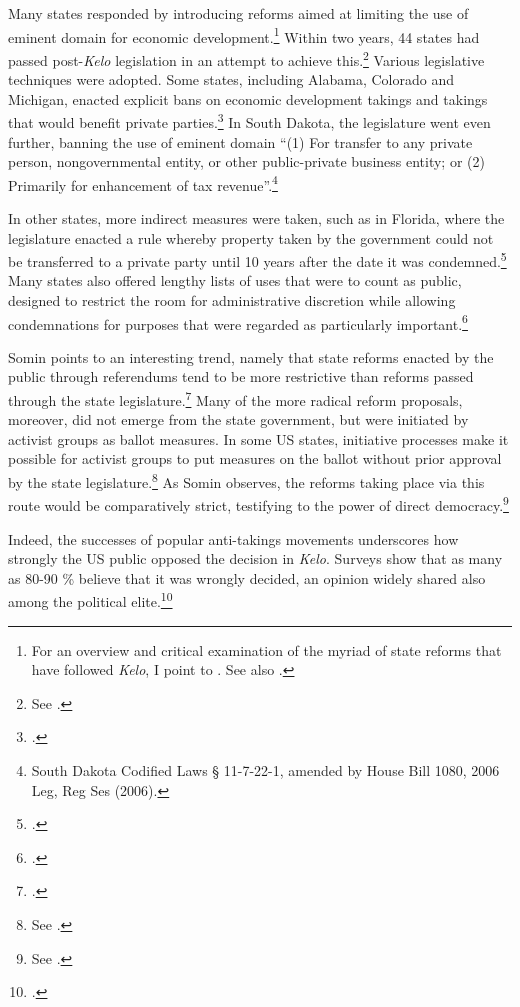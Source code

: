 Many states responded by introducing reforms aimed at limiting the use of eminent domain for economic development.\footnote{For an overview and critical examination of the myriad of state reforms that have followed {\it Kelo}, I point to \cite{eagle08}. See also \cite{somin09}.} Within two years, 44 states had passed post-{\it Kelo} legislation in an attempt to achieve this.\footnote{See \cite{castle}.} Various legislative techniques were adopted. Some states, including Alabama, Colorado and Michigan, enacted explicit bans on economic development takings and takings that would benefit private parties.\footcite[See][107-108]{eagle08} In South Dakota, the legislature went even further, banning the use of eminent domain ``(1) For transfer to any private person, nongovernmental entity, or other public-private business entity; or (2) Primarily for enhancement of tax revenue''.\footnote{South Dakota Codified Laws § 11-7-22-1, amended by House Bill 1080, 2006 Leg, Reg Ses (2006).}

In other states, more indirect measures were taken, such as in Florida, where the legislature enacted a rule whereby property taken by the government could not be transferred to a private party until 10 years after the date it was condemned.\footcite[809]{eagle08} Many states also offered lengthy lists of uses that were to count as public, designed to restrict the room for administrative discretion while allowing condemnations for purposes that were regarded as particularly important.\footcite[804]{eagle08}

Somin points to an interesting trend, namely that state reforms enacted by the public through referendums tend to be more restrictive than reforms passed through the state legislature.\footcite[2143]{somin09} Many of the more radical reform proposals, moreover, did not emerge from the state government, but were initiated by activist groups as ballot measures. In some US states, initiative processes make it possible for activist groups to put measures on the ballot without prior approval by the state legislature.\footnote{See \cite[2148]{somin09}.} As Somin observes, the reforms taking place via this route would be comparatively strict, testifying to the power of direct democracy.\footnote{See \cite[2143-2149]{somin09}.}

Indeed, the successes of popular anti-takings movements  underscores how strongly the US public opposed the decision in {\it Kelo}. Surveys show that as many as 80-90 \% believe that it was wrongly decided, an opinion widely shared also among the political elite.\footcite[2109]{somin09} 

